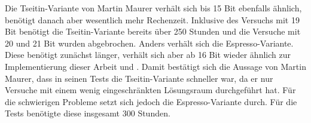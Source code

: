 Die Tseitin-Variante von Martin Maurer verhält sich bis 15 Bit ebenfalls ähnlich, benötigt danach aber wesentlich mehr Rechenzeit.
Inklusive des Versuchs mit 19 Bit benötigt die Tseitin-Variante bereits über 250 Stunden und die Versuche mit 20 und 21 Bit wurden
abgebrochen. Anders verhält sich die Espresso-Variante. Diese benötigt zunächst länger, verhält sich aber ab 16 Bit wieder ähnlich
zur Implementierung dieser Arbeit und . Damit bestätigt sich die Aussage von Martin Maurer, dass in seinen Tests die Tseitin-Variante
schneller war, da er nur Versuche mit einem wenig eingeschränkten Lösungsraum durchgeführt hat. Für die schwierigen Probleme
setzt sich jedoch die Espresso-Variante durch. Für die Tests benötigte diese insgesamt 300 Stunden.